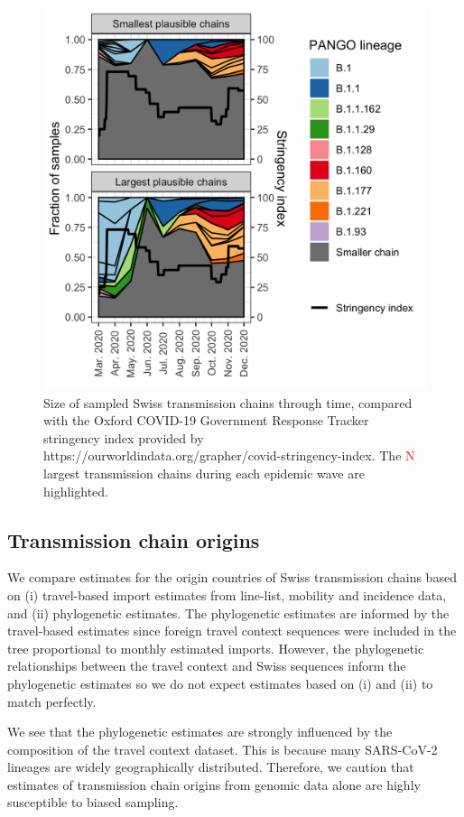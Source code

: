 \documentclass[9pt,twocolumn,twoside,lineno]{pnas-new}
\begin{document}
\begin{figure}[tbhp]
\centering
\includegraphics[width=.8\linewidth]{figures/fig_1_chains_through_time.png}
\caption{Size of sampled Swiss transmission chains through time, compared with the Oxford COVID-19 Government Response Tracker stringency index provided by https://ourworldindata.org/grapher/covid-stringency-index. The \textcolor{red}{N} largest transmission chains during each epidemic wave are highlighted.}  
\label{fig:chain-sizes}
\end{figure}

\subsection{Transmission chain origins}
We compare estimates for the origin countries of Swiss transmission chains based on (i) travel-based import estimates from line-list, mobility and incidence data, and (ii) phylogenetic estimates. The phylogenetic estimates are informed by the travel-based estimates since foreign travel context sequences were included in the tree proportional to monthly estimated imports. However, the phylogenetic relationships between the travel context and Swiss sequences inform the phylogenetic estimates so we do not expect estimates based on (i) and (ii) to match perfectly. 

We see that the phylogenetic estimates are strongly influenced by the composition of the travel context dataset. This is because many SARS-CoV-2 lineages are widely geographically distributed. Therefore, we caution that estimates of transmission chain origins from genomic data alone are highly susceptible to biased sampling.
\end{document}
